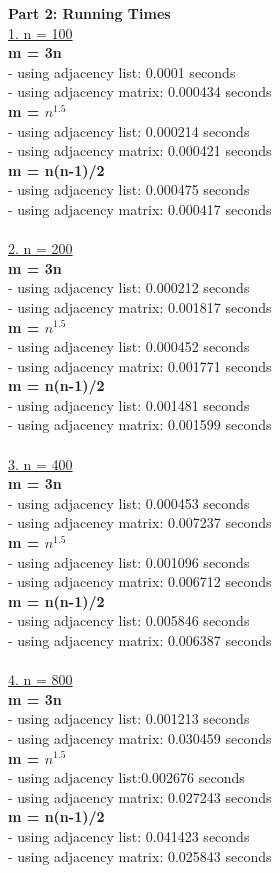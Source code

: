 \documentclass[letterpaper,12pt]{article}
\begin{document}
\begin{enumerate}
\textbf{Part 2: Running Times} \\
\underline{1. n = 100} \\
\textbf{m = 3n} \\
- using adjacency list: 0.0001 seconds \\
- using adjacency matrix: 0.000434 seconds \\
\textbf{m = $n^{1.5}$} \\
- using adjacency list: 0.000214 seconds \\
- using adjacency matrix: 0.000421 seconds \\
\textbf{m = n(n-1)/2} \\
- using adjacency list: 0.000475 seconds \\
- using adjacency matrix: 0.000417 seconds \\
\\
\underline{2. n = 200} \\
\textbf{m = 3n} \\
- using adjacency list: 0.000212 seconds \\
- using adjacency matrix: 0.001817 seconds \\
\textbf{m = $n^{1.5}$} \\
- using adjacency list: 0.000452 seconds \\
- using adjacency matrix: 0.001771 seconds \\
\textbf{m = n(n-1)/2} \\
- using adjacency list: 0.001481 seconds \\
- using adjacency matrix: 0.001599 seconds \\
\\
\underline{3. n = 400} \\
\textbf{m = 3n} \\
- using adjacency list: 0.000453 seconds \\
- using adjacency matrix: 0.007237 seconds \\
\textbf{m = $n^{1.5}$} \\
- using adjacency list: 0.001096 seconds \\
- using adjacency matrix: 0.006712 seconds \\
\textbf{m = n(n-1)/2} \\
- using adjacency list: 0.005846 seconds \\
- using adjacency matrix: 0.006387 seconds \\
\\
\underline{4. n = 800} \\
\textbf{m = 3n} \\
- using adjacency list: 0.001213 seconds \\
- using adjacency matrix: 0.030459 seconds \\
\textbf{m = $n^{1.5}$} \\
- using adjacency list:0.002676 seconds \\
- using adjacency matrix: 0.027243 seconds \\
\textbf{m = n(n-1)/2} \\
- using adjacency list: 0.041423 seconds \\
- using adjacency matrix: 0.025843 seconds \\

\end{enumerate}
\end{document}
